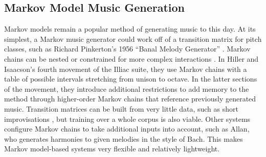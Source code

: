 \subsection{Markov Model Music Generation}
Markov models remain a popular method of generating music to this day. At its simplest, a Markov music generator could work off of a transition matrix for pitch classes, such as Richard Pinkerton’s 1956 “Banal Melody Generator” \cite{Pinkerton_1956}. 
Markov chains can be nested or constrained for more complex interactions \cite{Collins_Laney_2017}. In Hiller and Isaacson's \cite{Hiller_Isaacson_1959} fourth movement of the Illiac suite, they use Markov chains with a table of possible intervals stretching from unison to octave. In the latter sections of the movement, they introduce additional restrictions to add memory to the method through higher-order Markov chains that reference previously generated music. 
Transition matrices can be built from very little data, such as short improvisations \cite{Pachet_2003}, but training over a whole corpus is also viable. Other systems configure Markov chains to take additional inputs into account, such as Allan, \cite{Allan_2002} who generates harmonies to given melodies in the style of Bach. This makes Markov model-based systems very flexible and relatively lightweight.

